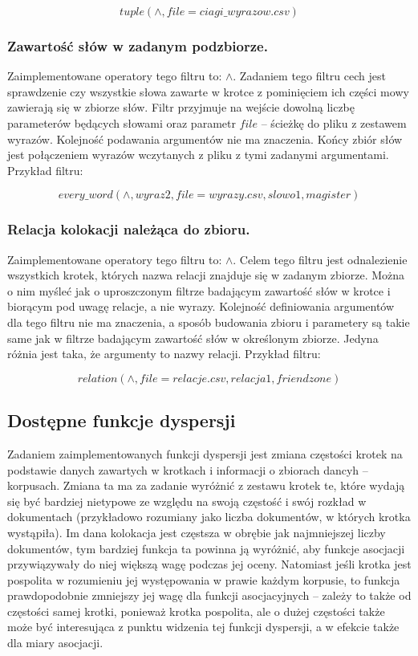 \documentclass[11pt,a4paper]{llncs}
\begin{document}
$$ tuple(\wedge,file=ciagi\_wyrazow.csv) $$

\subsubsection{Zawartość słów w zadanym podzbiorze.}
Zaimplementowane operatory tego filtru to: $\wedge$.
Zadaniem tego filtru cech jest sprawdzenie czy wszystkie słowa zawarte w krotce z pominięciem ich części mowy zawierają się w zbiorze słów.
Filtr przyjmuje na wejście dowolną liczbę parameterów będących słowami oraz parametr $ file $ -- ścieżkę do pliku z zestawem wyrazów.
Kolejność podawania argumentów nie ma znaczenia.
Końcy zbiór słów jest połączeniem wyrazów wczytanych z pliku z tymi zadanymi argumentami.
Przykład filtru:

$$ every\_word(\wedge,wyraz2,file=wyrazy.csv,slowo1,magister) $$

\subsubsection{Relacja kolokacji należąca do zbioru.}
Zaimplementowane operatory tego filtru to: $\wedge$.
Celem tego filtru jest odnalezienie wszystkich krotek, których nazwa relacji znajduje się w zadanym zbiorze.
Można o nim myśleć jak o uproszczonym filtrze badającym zawartość słów w krotce i biorącym pod uwagę relacje, a nie wyrazy.
Kolejność definiowania argumentów dla tego filtru nie ma znaczenia, a sposób budowania zbioru i parametery są takie same jak w filtrze badającym zawartość słów w określonym zbiorze.
Jedyna różnia jest taka, że argumenty to nazwy relacji.
Przykład filtru:

$$ relation(\wedge,file=relacje.csv,relacja1,friendzone) $$


\subsection{Dostępne funkcje dyspersji}
Zadaniem zaimplementowanych funkcji dyspersji jest zmiana częstości krotek na podstawie danych zawartych w krotkach i informacji o zbiorach dancyh -- korpusach.
Zmiana ta ma za zadanie wyróżnić z zestawu krotek te, które wydają się być bardziej nietypowe ze względu na swoją częstość i swój rozkład w dokumentach (przykładowo rozumiany jako liczba dokumentów, w których krotka wystąpiła).
Im dana kolokacja jest częstsza w obrębie jak najmniejszej liczby dokumentów, tym bardziej funkcja ta powinna ją wyróżnić, aby funkcje asocjacji przywiązywały do niej większą wagę podczas jej oceny.
Natomiast jeśli krotka jest pospolita w rozumieniu jej występowania w prawie każdym korpusie, to funkcja prawdopodobnie zmniejszy jej wagę dla funkcji asocjacyjnych -- zależy to także od częstości samej krotki, ponieważ krotka pospolita, ale o dużej częstości także może być interesująca z punktu widzenia tej funkcji dyspersji, a w efekcie także dla miary asocjacji.
\end{document}
